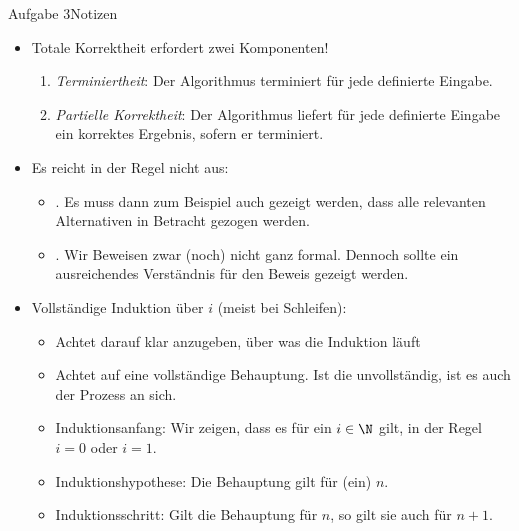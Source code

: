 \begin{frame}{Aufgabe 3\hfill Notizen}
    \begin{itemize}[<+(1)->]
        \item Totale Korrektheit erfordert zwei Komponenten! \begin{enumerate}
            \item \textit{Terminiertheit}: Der Algorithmus terminiert für jede definierte Eingabe.
            \item \textit{Partielle Korrektheit}: Der Algorithmus liefert für jede definierte Eingabe ein korrektes Ergebnis, sofern er terminiert.
        \end{enumerate}
        \medskip
        \item Es reicht in der Regel nicht aus: \begin{itemize}
            \item {}.\pause{} Es muss dann zum Beispiel auch gezeigt werden, dass alle relevanten Alternativen in Betracht gezogen werden.
            \item {}.\pause{} Wir Beweisen zwar (noch) nicht ganz formal. Dennoch sollte ein ausreichendes Verständnis für den Beweis gezeigt werden.
        \end{itemize}\medskip
        \item Vollständige Induktion über \(i\) (meist bei Schleifen): \begin{itemize}
            \item Achtet darauf klar anzugeben, über was die Induktion läuft\pause\ 
            \item Achtet auf eine vollständige Behauptung. Ist die unvollständig, ist es auch der Prozess an sich.
            \item Induktionsanfang: Wir zeigen, dass es für ein \(i \in \N\) gilt, in der Regel \(i = 0\) oder \(i = 1\).
            \item Induktionshypothese: Die Behauptung gilt für (ein) \(n\).
            \item Induktionsschritt: Gilt die Behauptung für \(n\), so gilt sie auch für \(n + 1\).\pause{} 
        \end{itemize}
    \end{itemize}
\end{frame}

